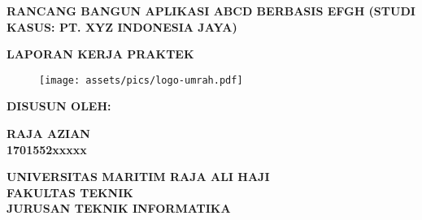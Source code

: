 \begin{titlepage}
    \thispagestyle{empty}
    \begin{center}
        \begin{large}\begin{spacing}{1}
                \textbf{RANCANG BANGUN APLIKASI ABCD BERBASIS EFGH (STUDI KASUS: PT. XYZ INDONESIA JAYA)}
            \end{spacing}\end{large}

        \vspace{2cm}
        \textbf{LAPORAN KERJA PRAKTEK}

        \vspace{1cm}
        \begin{figure}[h]
            \centering
            \texttt{[image: assets/pics/logo-umrah.pdf]}
            \label{fig:universitylogo}
        \end{figure}

        \vspace{1cm}
        \textbf{DISUSUN OLEH:}

        \vspace{1cm}
        \textbf{RAJA AZIAN \\
            1701552xxxxx}

        \vspace{2cm}
        \textbf{UNIVERSITAS MARITIM RAJA ALI HAJI\\
            FAKULTAS TEKNIK\\
            JURUSAN TEKNIK INFORMATIKA\\}

        \vspace{\baselineskip}
        \textbf{\large \the\year{}}
    \end{center}
\end{titlepage}